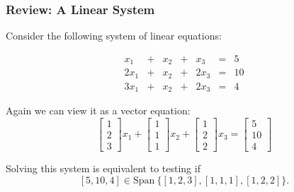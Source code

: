 

\begin{frame}
  \frametitle{Review: A Linear System}

  Consider the following system of linear equations:

  \[
  \begin{array}{ccccccr}
    x_1 &+& x_2 &+& x_3 &=& 5\\
    2x_1 &+& x_2 &+& 2x_3 &=& 10\\
    3x_1 &+& x_2 &+& 2x_3 &=& 4
  \end{array}
  \]
  \pause

  Again we can view it as a vector equation:
  \[
  \begin{bmatrix}
    1\\
    2\\
    3
  \end{bmatrix}
  x_1 +
  \begin{bmatrix}
    1\\
    1\\
    1
  \end{bmatrix}
  x_2 +
  \begin{bmatrix}
    1\\
    2\\
    2
  \end{bmatrix}
  x_3
  =
  \begin{bmatrix}
    5\\
    10\\
    4
  \end{bmatrix}
  \]
  \pause

  Solving this system is equivalent to testing if
  \[
    [5,10,4]\in\mathrm{Span}~\{[1,2,3],[1,1,1],[1,2,2]\}.
    \]
\end{frame}


